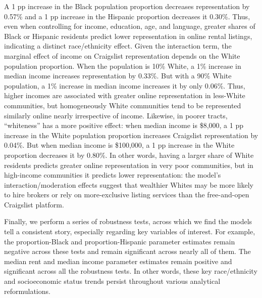 \documentclass[11pt,letterpaper]{article}
\begin{document}
A 1 pp increase in the Black population proportion decreases representation by 0.57\% and a 1 pp increase in the Hispanic proportion decreases it 0.30\%. Thus, even when controlling for income, education, age, and language, greater shares of Black or Hispanic residents predict lower representation in online rental listings, indicating a distinct race/ethnicity effect. Given the interaction term, the marginal effect of income on Craigslist representation depends on the White population proportion. When the population is 10\% White, a 1\% increase in median income increases representation by 0.33\%. But with a 90\% White population, a 1\% increase in median income increases it by only 0.06\%. Thus, higher incomes are associated with greater online representation in less-White communities, but homogeneously White communities tend to be represented similarly online nearly irrespective of income. Likewise, in poorer tracts, \enquote{whiteness} has a more positive effect: when median income is \$8,000, a 1 pp increase in the White population proportion increases Craigslist representation by 0.04\%. But when median income is \$100,000, a 1 pp increase in the White proportion decreases it by 0.80\%. In other words, having a larger share of White residents predicts greater online representation in very poor communities, but in high-income communities it predicts lower representation: the model's interaction/moderation effects suggest that wealthier Whites may be more likely to hire brokers or rely on more-exclusive listing services than the free-and-open Craigslist platform.

Finally, we perform a series of robustness tests, across which we find the models tell a consistent story, especially regarding key variables of interest. For example, the proportion-Black and proportion-Hispanic parameter estimates remain negative across these tests and remain significant across nearly all of them. The median rent and median income parameter estimates remain positive and significant across all the robustness tests. In other words, these key race/ethnicity and socioeconomic status trends persist throughout various analytical reformulations.
\end{document}
